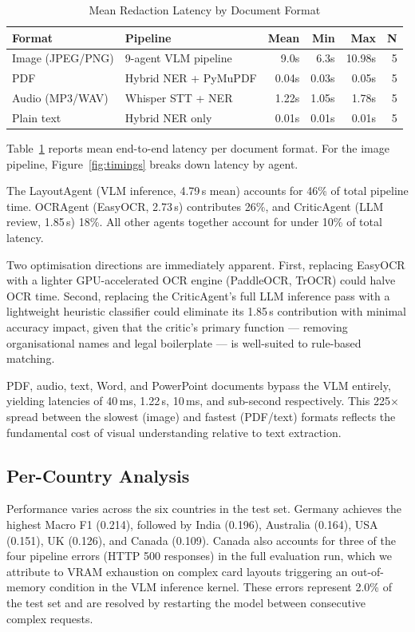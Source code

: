 \documentclass[conference]{IEEEtran}
\begin{document}
\begin{table}[h]\centering
\caption{Mean Redaction Latency by Document Format}
\label{tab:latency}
\begin{tabular}{llrrrr}
\toprule
Format & Pipeline & Mean & Min & Max & N \\
\midrule
Image (JPEG/PNG) & 9-agent VLM pipeline & 9.0s & 6.3s & 10.98s & 5 \\
PDF & Hybrid NER + PyMuPDF & 0.04s & 0.03s & 0.05s & 5 \\
Audio (MP3/WAV) & Whisper STT + NER & 1.22s & 1.05s & 1.78s & 5 \\
Plain text & Hybrid NER only & 0.01s & 0.01s & 0.01s & 5 \\
\bottomrule
\end{tabular}
\end{table}

Table~\ref{tab:latency} reports mean end-to-end
latency per document format.
For the image pipeline, Figure~\ref{fig:timings}
breaks down latency by agent.

The LayoutAgent (VLM inference, 4.79\,s mean)
accounts for 46\% of total pipeline time.
OCRAgent (EasyOCR, 2.73\,s) contributes 26\%,
and CriticAgent (LLM review, 1.85\,s) 18\%.
All other agents together account for under 10\%
of total latency.

Two optimisation directions are immediately apparent.
First, replacing EasyOCR with a lighter
GPU-accelerated OCR engine (PaddleOCR, TrOCR) could
halve OCR time.
Second, replacing the CriticAgent's full LLM
inference pass with a lightweight heuristic
classifier could eliminate its 1.85\,s contribution
with minimal accuracy impact, given that the critic's
primary function --- removing organisational names
and legal boilerplate --- is well-suited to
rule-based matching.

PDF, audio, text, Word, and PowerPoint documents
bypass the VLM entirely, yielding latencies of
40\,ms, 1.22\,s, 10\,ms, and sub-second
respectively.
This 225$\times$ spread between the slowest
(image) and fastest (PDF/text) formats reflects
the fundamental cost of visual understanding relative
to text extraction.

\subsection{Per-Country Analysis}

Performance varies across the six countries in the
test set.
Germany achieves the highest Macro F1 (0.214),
followed by India (0.196), Australia (0.164), USA
(0.151), UK (0.126), and Canada (0.109).
Canada also accounts for three of the four pipeline
errors (HTTP 500 responses) in the full evaluation
run, which we attribute to VRAM exhaustion on
complex card layouts triggering an out-of-memory
condition in the VLM inference kernel.
These errors represent 2.0\% of the test set and
are resolved by restarting the model between
consecutive complex requests.
\end{document}
